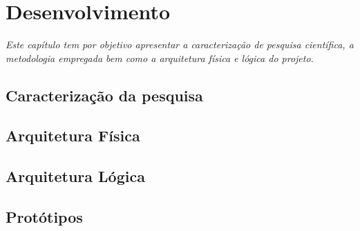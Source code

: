 \chapter{Desenvolvimento}
\label{cap:03}

\textit{Este capítulo tem por objetivo apresentar a caracterização de pesquisa científica, a metodologia empregada bem como a arquitetura física e lógica do projeto.}\\

\section{Caracterização da pesquisa}

\section{Arquitetura Física}

\section{Arquitetura Lógica}

\section{Protótipos}